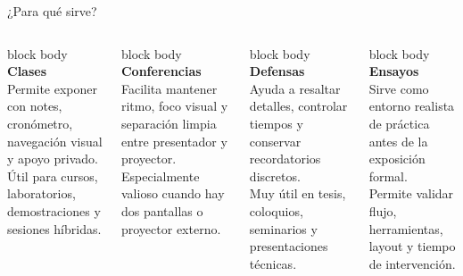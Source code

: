 \documentclass[aspectratio=169,professionalfonts]{beamer}
\newcommand{\dashboardcard}[3]{
\begin{beamercolorbox}[wd=\linewidth,sep=0.9em,rounded=true,shadow=true]{block body}
{\color{PVBlue}\large\bfseries #1}\\[0.35em]
{\normalsize #2}\\[0.45em]
{\color{PVSlate}\small #3}
\end{beamercolorbox}
}
\begin{document}
\begin{frame}{¿Para qué sirve?}

\begin{columns}[T,totalwidth=\textwidth]
\begin{small}
\dashboardcard{Clases}{Permite exponer con notes, cronómetro, navegación visual y apoyo privado.}{Útil para cursos, laboratorios, demostraciones y sesiones híbridas.}
\end{small}
\vspace{0.3cm}
\begin{small}
\dashboardcard{Conferencias}{Facilita mantener ritmo, foco visual y separación limpia entre presentador y proyector.}{Especialmente valioso cuando hay dos pantallas o proyector externo.}
\end{small}
\begin{small}
  \dashboardcard{Defensas}{Ayuda a resaltar detalles, controlar tiempos y conservar recordatorios discretos.}{Muy útil en tesis, coloquios, seminarios y presentaciones técnicas.}
\end{small}

\vspace{0.3cm}
\begin{small}
\dashboardcard{Ensayos}{Sirve como entorno realista de práctica antes de la exposición formal.}{Permite validar flujo, herramientas, layout y tiempo de intervención.}
\end{small}
\end{columns}

\end{frame}
\end{document}
